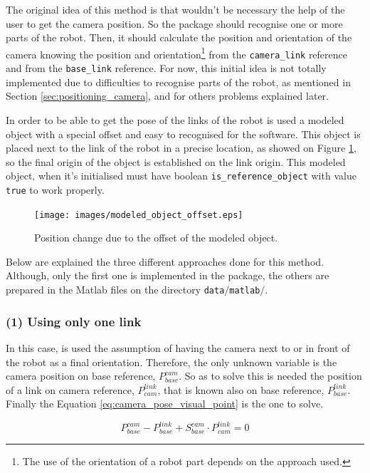 \documentclass[12pt,a4paper,final,twoside,openright]{report}
\begin{document}
The original idea of this method is that wouldn't be necessary the help of the user to get the camera position. So the package should recognise one or more parts of the robot. Then, it should calculate the position and orientation of the camera knowing the position and orientation\footnote{The use of the orientation of a robot part depends on the approach used.} from the \texttt{camera\_link} reference and from the \texttt{base\_link} reference. For now, this initial idea is not totally implemented due to difficulties to recognise parts of the robot, as mentioned in Section \ref{sec:positioning_camera}, and for others problems explained later.

In order to be able to get the pose of the links of the robot is used a modeled object with a special offset and easy to recognised for the software. This object is placed next to the link of the robot in a precise location, as showed on Figure \ref{fig:modeled_object_offset}, so the final origin of the object is established on the link origin. This modeled object, when it's initialised must have boolean \texttt{is\_reference\_object} with value \texttt{true} to work properly.

\begin{figure}
\centering
\texttt{[image: images/modeled\_object\_offset.eps]}
\caption{Position change due to the offset of the modeled object.\label{fig:modeled_object_offset}}
\end{figure}

Below are explained the three different approaches done for this method. Although, only the first one is implemented in the package, the others are prepared in the Matlab files on the directory \texttt{data$/$matlab$/$}.

\subsubsection{(1) Using only one link}

In this case, is used the assumption of having the camera next to or in front of the robot as a final orientation. Therefore, the only unknown variable is the camera position on base reference, $P_{base}^{cam}$. So as to solve this is needed the position of a link on camera reference, $P_{cam}^{link}$, that is known also on base reference, $P_{base}^{link}$. Finally the Equation \eqref{eq:camera_pose_visual_point} is the one to solve.

\begin{equation}\label{eq:camera_pose_visual_point}
P_{base}^{cam} - P_{base}^{link} + S_{base}^{cam} \cdot P_{cam}^{link} = 0
\end{equation}
\end{document}
